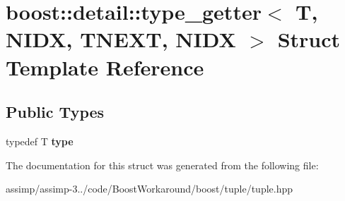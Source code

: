 \hypertarget{structboost_1_1detail_1_1type__getter_3_01_t_00_01_n_i_d_x_00_01_t_n_e_x_t_00_01_n_i_d_x_01_4}{\section{boost\+:\+:detail\+:\+:type\+\_\+getter$<$ T, N\+I\+D\+X, T\+N\+E\+X\+T, N\+I\+D\+X $>$ Struct Template Reference}
\label{structboost_1_1detail_1_1type__getter_3_01_t_00_01_n_i_d_x_00_01_t_n_e_x_t_00_01_n_i_d_x_01_4}
}
\subsection*{Public Types}
\begin{DoxyCompactItemize}
\item 
\hypertarget{structboost_1_1detail_1_1type__getter_3_01_t_00_01_n_i_d_x_00_01_t_n_e_x_t_00_01_n_i_d_x_01_4_a4a38b7a974757853403a32eeca990864}{typedef T {\bfseries type}}\label{structboost_1_1detail_1_1type__getter_3_01_t_00_01_n_i_d_x_00_01_t_n_e_x_t_00_01_n_i_d_x_01_4_a4a38b7a974757853403a32eeca990864}

\end{DoxyCompactItemize}


The documentation for this struct was generated from the following file\+:\begin{DoxyCompactItemize}
\item 
assimp/assimp-\/3../code/\+Boost\+Workaround/boost/tuple/tuple.\+hpp\end{DoxyCompactItemize}
